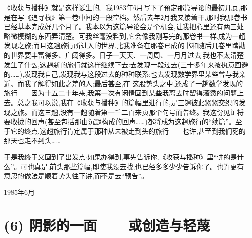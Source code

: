《收获与播种》就是这样诞生的。我1983年6月写下了预定那篇导论的最初几页,那是在写《追寻栈》第一卷中间的一段空档。然后去年2月我又接着干,那时我那卷书已经基本完成好几个月了。我本以为这篇导论会是个机会,让我把心里还有两三处略微模糊的东西弄清楚。可我丝毫没料到,它会像我刚写完的那卷书一样,成为一趟发现之旅;而且这趟旅行所进入的世界,比我准备在那卷已成的书和随后几卷里踏勘的世界要丰富得多、广阔得多。日子一天天、一周周、一月月过去,我也不太清楚发生了什么,这趟新的旅行就这样继续下去:去发现一段过去(三十多年来被执意回避的……),发现我自己,发现我与这段过去的种种联系;也去发现数学界里某些曾与我亲近、而我了解得如此之差的人;最后甚至,在
这股势头之中,还成了一趟数学发现的旅行——因为十五二十年来,我第一次有闲情回到某些我离去时留得滚烫的问题上去。总之我可以说,我在《收获与播种》的篇幅里进行的,是三趟彼此紧紧交织的发现之旅。而这三趟,没有一趟随着第一千二百来页那个句号而告终。我这份见证将要收拢的回声(甚至包括那由沉默构成的回声……)都将成为这趟旅行的“续篇”。至于它的终点,这趟旅行肯定属于那种从未被走到头的旅行——也许,甚至到我们死的那天也走不到头……

于是我终于又回到了出发点:如果办得到,事先告诉你,《收获与播种》里“讲的是什么”。可也真是,前头那些篇幅,即使我没去找,也已经多多少少告诉你了。也许更有意思的做法是顺着势头往下讲,而不是去“预告”。

\noindent 1985年6月\par

\section{(6) 阴影的一面——或创造与轻蔑}

